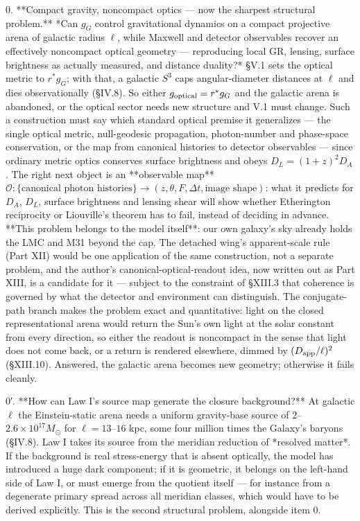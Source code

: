 0. **Compact gravity, noncompact optics — now the sharpest structural problem.** *Can $g_G$ control gravitational dynamics on a compact projective arena of galactic radius $\ell$, while Maxwell and detector observables recover an effectively noncompact optical geometry — reproducing local GR, lensing, surface brightness as actually measured, and distance duality?* §V.1 sets the optical metric to $r^*g_G$; with that, a galactic $S^3$ caps angular-diameter distances at $\ell$ and dies observationally (§IV.8). So either $g_{\rm optical} = r^*g_G$ and the galactic arena is abandoned, or the optical sector needs new structure and V.1 must change. Such a construction must say which standard optical premise it generalizes — the single optical metric, null-geodesic propagation, photon-number and phase-space conservation, or the map from canonical histories to detector observables — since ordinary metric optics conserves surface brightness and obeys $D_L = (1+z)^2D_A$. The right next object is an **observable map** $\mathcal O:\{\text{canonical photon histories}\}\to(z,\theta,F,\Delta t,\text{image shape})$: what it predicts for $D_A$, $D_L$, surface brightness and lensing shear will show whether Etherington reciprocity or Liouville's theorem has to fail, instead of deciding in advance. **This problem belongs to the model itself**: our own galaxy's sky already holds the LMC and M31 beyond the cap. The detached wing's apparent-scale rule (Part XII) would be one application of the same construction, not a separate problem, and the author's canonical-optical-readout idea, now written out as Part XIII, is a candidate for it — subject to the constraint of §XIII.3 that coherence is governed by what the detector and environment can distinguish. The conjugate-path branch makes the problem exact and quantitative: light on the closed representational arena would return the Sun's own light at the solar constant from every direction, so either the readout is noncompact in the sense that light does not come back, or a return is rendered elsewhere, dimmed by $(D_{\rm app}/\ell)^2$ (§XIII.10). Answered, the galactic arena becomes new geometry; otherwise it fails cleanly.

0′. **How can Law I's source map generate the closure background?** At galactic $\ell$ the Einstein-static arena needs a uniform gravity-base source of $2$–$2.6\times10^{17}M_\odot$ for $\ell = 13$–$16$ kpc, some four million times the Galaxy's baryons (§IV.8). Law I takes its source from the meridian reduction of *resolved matter*. If the background is real stress-energy that is absent optically, the model has introduced a huge dark component; if it is geometric, it belongs on the left-hand side of Law I, or must emerge from the quotient itself — for instance from a degenerate primary spread across all meridian classes, which would have to be derived explicitly. This is the second structural problem, alongside item 0.

